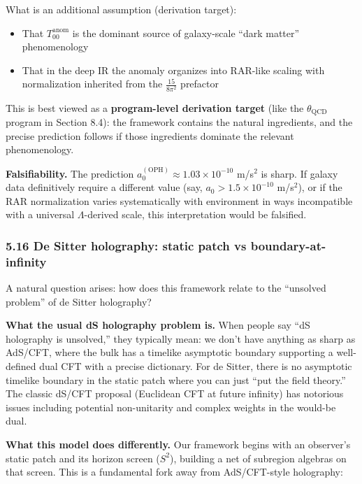\documentclass[11pt,a4paper]{article}
\theoremstyle{remark}
\providecommand{\tightlist}{%
  \setlength{\itemsep}{0pt}\setlength{\parskip}{0pt}}
\begin{document}
What is an additional assumption (derivation target):

\begin{itemize}
\tightlist
\item
  That \(T_{00}^{\mathrm{anom}}\) is the dominant source of galaxy-scale
  ``dark matter'' phenomenology
\item
  That in the deep IR the anomaly organizes into RAR-like scaling with
  normalization inherited from the \(\frac{15}{8\pi^2}\) prefactor
\end{itemize}

This is best viewed as a \textbf{program-level derivation target} (like the
\(\theta_{\mathrm{QCD}}\) program in Section 8.4): the framework contains
the natural ingredients, and the precise prediction follows if those
ingredients dominate the relevant phenomenology.

\textbf{Falsifiability.} The prediction \(a_0^{\mathrm{(OPH)}} \approx 1.03 \times
10^{-10}\) m/s\(^2\) is sharp. If galaxy data definitively require a different
value (say, \(a_0 > 1.5 \times 10^{-10}\) m/s\(^2\)), or if the RAR normalization
varies systematically with environment in ways incompatible with a universal
\(\Lambda\)-derived scale, this interpretation would be falsified.

\subsubsection{5.16 De Sitter holography: static patch vs boundary-at-infinity}\label{de-sitter-holography-static-patch-vs-boundary-at-infinity}

A natural question arises: how does this framework relate to the ``unsolved
problem'' of de Sitter holography?

\textbf{What the usual dS holography problem is.} When people say ``dS holography
is unsolved,'' they typically mean: we don't have anything as sharp as
AdS/CFT, where the bulk has a timelike asymptotic boundary supporting a
well-defined dual CFT with a precise dictionary. For de Sitter, there is no
asymptotic timelike boundary in the static patch where you can just ``put
the field theory.'' The classic dS/CFT proposal (Euclidean CFT at future
infinity) has notorious issues including potential non-unitarity and
complex weights in the would-be dual.

\textbf{What this model does differently.} Our framework begins with an
observer's static patch and its horizon screen (\(S^2\)), building a net of
subregion algebras on that screen. This is a fundamental fork away from
AdS/CFT-style holography:
\end{document}
